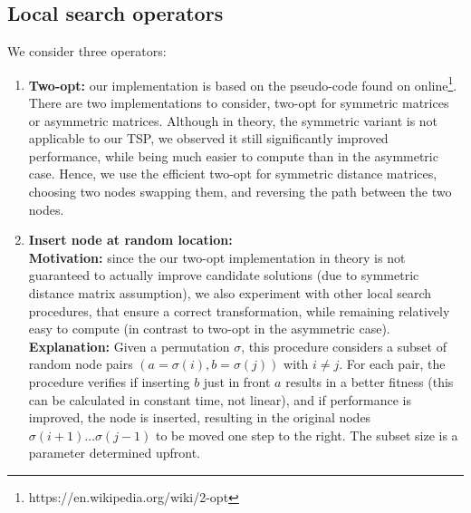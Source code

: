 \documentclass[a4paper,10pt]{article}
\begin{document}
\subsection{Local search operators}
	We consider three operators:
	\begin{enumerate}
		\item \textbf{Two-opt:} our implementation is based on the pseudo-code found on online\footnote{https://en.wikipedia.org/wiki/2-opt}. There are two implementations to consider, two-opt for symmetric matrices or asymmetric matrices. Although in theory, the symmetric variant is not applicable to our TSP, we observed it still significantly improved performance, while being much easier to compute than in the asymmetric case. Hence, we use the efficient two-opt for symmetric distance matrices, choosing two nodes swapping them, and reversing the path between the two nodes.
		
		\item \textbf{Insert node at random location:}\\
		\textbf{Motivation:} since the our two-opt implementation in theory is not guaranteed to actually improve candidate solutions (due to symmetric distance matrix assumption), we also experiment with other local search procedures, that ensure a correct transformation, while remaining relatively easy to compute (in contrast to two-opt in the asymmetric case). \\
		\textbf{Explanation:} Given a permutation $\sigma$, this procedure considers a subset of random node pairs $\left(a = \sigma(i), b = \sigma(j)\right)$ with $i \neq j$. For each pair, the procedure verifies if inserting $b$ just in front $a$ results in a better fitness (this can be calculated in constant time, not linear), and if performance is improved, the node is inserted, resulting in the original nodes $\sigma(i+1) \dots \sigma(j-1)$ to be moved one step to the right. The subset size is a parameter determined upfront.


\end{enumerate}
\end{document}
